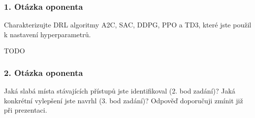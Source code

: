\begin{frame}
    \frametitle{1. Otázka oponenta}
    \large{Charakterizujte DRL algoritmy A2C, SAC, DDPG, PPO a TD3, které jste použil k nastavení hyperparametrů.}

    TODO
%

\end{frame}

\begin{frame}
    \frametitle{2. Otázka oponenta}
    \large{Jaká slabá místa stávajících přístupů jste identifikoval (2. bod zadání)? Jaká konkrétní vylepšení jste navrhl (3. bod zadání)? Odpověď doporučuji zmínit již při prezentaci.}
\end{frame}

